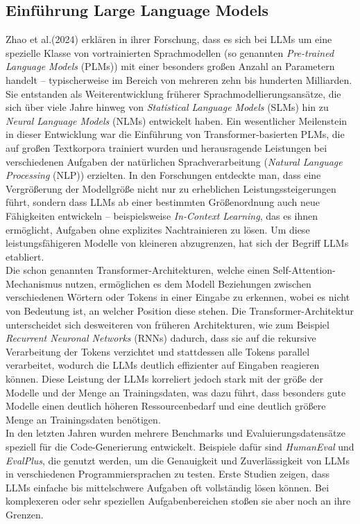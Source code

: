 \documentclass[11pt,a4paper]{article}
\begin{document}
\subsection{Einführung Large Language Models}
\label{sec:LLMs}
Zhao et al.(2024)\cite{zhao2024surveylargelanguagemodels} erklären in ihrer Forschung, dass es sich bei LLMs um eine spezielle Klasse von vortrainierten Sprachmodellen (so genannten \emph{Pre-trained Language Models} (PLMs)) mit einer besonders großen Anzahl an Parametern handelt – typischerweise im Bereich von mehreren zehn bis hunderten Milliarden. Sie entstanden als Weiterentwicklung früherer Sprachmodellierungsansätze, die sich über viele Jahre hinweg von \emph{Statistical Language Models} (SLMs) hin zu \emph{Neural Language Models} (NLMs) entwickelt haben. Ein wesentlicher Meilenstein in dieser Entwicklung war die Einführung von Transformer-basierten PLMs, die auf großen Textkorpora trainiert wurden und herausragende Leistungen bei verschiedenen Aufgaben der natürlichen Sprachverarbeitung (\emph{Natural Language Processing} (NLP)) erzielten. In den Forschungen entdeckte man, dass eine Vergrößerung der Modellgröße nicht nur zu erheblichen Leistungssteigerungen führt, sondern dass LLMs ab einer bestimmten Größenordnung auch neue Fähigkeiten entwickeln – beispielsweise \emph{In-Context Learning}, das es ihnen ermöglicht, Aufgaben ohne explizites Nachtrainieren zu lösen. Um diese leistungsfähigeren Modelle von kleineren abzugrenzen, hat sich der Begriff LLMs etabliert\cite{zhao2024surveylargelanguagemodels}.\\
Die schon genannten Transformer-Architekturen, welche einen Self-Attention-Mechanismus nutzen, ermöglichen es dem Modell Beziehungen zwischen verschiedenen Wörtern oder Tokens in einer Eingabe zu erkennen, wobei es nicht von Bedeutung ist, an welcher Position diese stehen. Die Transformer-Architektur unterscheidet sich desweiteren von früheren Architekturen, wie zum Beispiel \emph{Recurrent Neuronal Networks} (RNNs) dadurch, dass sie auf die rekursive Verarbeitung der Tokens verzichtet und stattdessen alle Tokens parallel verarbeitet, wodurch die LLMs deutlich effizienter auf Eingaben reagieren können. Diese Leistung der LLMs korreliert jedoch stark mit der größe der Modelle und der Menge an Trainingsdaten, was dazu führt, dass besonders gute Modelle einen deutlich höheren Ressourcenbedarf und eine deutlich größere Menge an Trainingsdaten benötigen\cite{jiang2024surveylargelanguagemodels}.\\
In den letzten Jahren wurden mehrere Benchmarks und Evaluierungsdatensätze speziell für die Code-Generierung entwickelt. Beispiele dafür sind \emph{HumanEval}\cite{chen2021evaluatinglargelanguagemodels} und \emph{EvalPlus}\cite{evalplus}, die genutzt werden, um die Genauigkeit und Zuverlässigkeit von LLMs in verschiedenen Programmiersprachen zu testen. Erste Studien zeigen, dass LLMs einfache bis mittelschwere Aufgaben oft vollständig lösen können. Bei komplexeren oder sehr speziellen Aufgabenbereichen stoßen sie aber noch an ihre Grenzen\cite{NEURIPS2023_43e9d647}.
\end{document}
